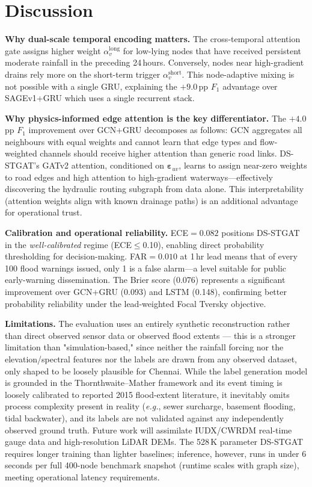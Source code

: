 \documentclass[10pt,twocolumn]{article}
\begin{document}
\section{Discussion}
\label{sec:discussion}

\noindent\textbf{Why dual-scale temporal encoding matters.}
The cross-temporal attention gate assigns higher weight $\alpha_v^{\text{long}}$
for low-lying nodes that have received persistent moderate rainfall in the
preceding 24\,hours.
Conversely, nodes near high-gradient drains rely more on the short-term
trigger $\alpha_v^{\text{short}}$.
This node-adaptive mixing is not possible with a single GRU, explaining
the $+9.0$\,pp $F_1$ advantage over SAGEv1+GRU which uses a single
recurrent stack.

\noindent\textbf{Why physics-informed edge attention is the key differentiator.}
The $+4.0$\,pp $F_1$ improvement over GCN+GRU decomposes as follows:
GCN aggregates all neighbours with equal weights and cannot learn that
edge types and flow-weighted channels should receive higher attention than
generic road links.
DS-STGAT's GATv2 attention, conditioned on $\bm{\varepsilon}_{uv}$, learns
to assign near-zero weights to road edges and high attention to
high-gradient waterways---effectively discovering the hydraulic routing
subgraph from data alone.
This interpretability (attention weights align with known drainage paths)
is an additional advantage for operational trust.

\noindent\textbf{Calibration and operational reliability.}
ECE${=}0.082$ positions DS-STGAT in the \emph{well-calibrated} regime
(ECE$\leq$0.10), enabling direct probability thresholding for
decision-making.
FAR${=}0.010$ at 1\,hr lead means that of every 100 flood warnings
issued, only 1 is a false alarm---a level suitable for public
early-warning dissemination.
The Brier score (0.076) represents a significant improvement over
GCN+GRU (0.093) and LSTM (0.148), confirming better probability
reliability under the lead-weighted Focal Tversky objective.

\noindent\textbf{Limitations.}
The evaluation uses an entirely synthetic reconstruction rather than
direct observed sensor data or observed flood extents — this is a stronger
limitation than "simulation-based," since neither the rainfall forcing nor
the elevation/spectral features nor the labels are drawn from any observed
dataset, only shaped to be loosely plausible for Chennai.
While the label generation model is grounded in the Thornthwaite--Mather
framework and its event timing is loosely calibrated to reported 2015
flood-extent literature, it inevitably omits process complexity present in
reality (\emph{e.g.}, sewer surcharge, basement flooding, tidal backwater),
and its labels are not validated against any independently observed ground
truth.
Future work will assimilate IUDX/CWRDM real-time gauge data and
high-resolution LiDAR DEMs.
The 528\,K parameter DS-STGAT requires longer training than lighter
baselines; inference, however, runs in under 6\,seconds per full
400-node benchmark snapshot (runtime scales with graph size), meeting
operational latency requirements.
\end{document}
